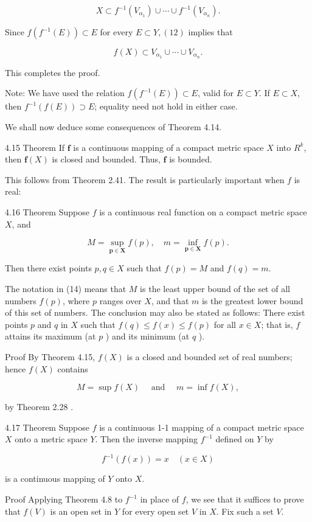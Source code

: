 \documentclass[10pt]{article}
\begin{document}
$$
X \subset f^{-1}\left(V_{\alpha_{1}}\right) \cup \cdots \cup f^{-1}\left(V_{\alpha_{n}}\right) .
$$

Since $f\left(f^{-1}(E)\right) \subset E$ for every $E \subset Y,(12)$ implies that

$$
f(X) \subset V_{\alpha_{1}} \cup \cdots \cup V_{\alpha_{n}} .
$$

This completes the proof.

Note: We have used the relation $f\left(f^{-1}(E)\right) \subset E$, valid for $E \subset Y$. If $E \subset X$, then $f^{-1}(f(E)) \supset E$; equality need not hold in either case.

We shall now deduce some consequences of Theorem 4.14.

4.15 Theorem If $\mathbf{f}$ is a continuous mapping of a compact metric space $X$ into $R^{k}$, then $\mathbf{f}(X)$ is closed and bounded. Thus, $\mathbf{f}$ is bounded.

This follows from Theorem 2.41. The result is particularly important when $f$ is real:

4.16 Theorem Suppose $f$ is a continuous real function on a compact metric space $X$, and

$$
M=\sup _{\boldsymbol{p} \in \boldsymbol{X}} f(p), \quad m=\inf _{\boldsymbol{p} \in \boldsymbol{X}} f(p) .
$$

Then there exist points $p, q \in X$ such that $f(p)=M$ and $f(q)=m$.

The notation in (14) means that $M$ is the least upper bound of the set of all numbers $f(p)$, where $p$ ranges over $X$, and that $m$ is the greatest lower bound of this set of numbers. The conclusion may also be stated as follows: There exist points $p$ and $q$ in $X$ such that $f(q) \leq f(x) \leq f(p)$ for all $x \in X$; that is, $f$ attains its maximum (at $p$ ) and its minimum (at $q$ ).

Proof By Theorem 4.15, $f(X)$ is a closed and bounded set of real numbers; hence $f(X)$ contains

$$
M=\sup f(X) \quad \text { and } \quad m=\inf f(X),
$$

by Theorem 2.28 .

4.17 Theorem Suppose $f$ is a continuous 1-1 mapping of a compact metric space $X$ onto a metric space $Y$. Then the inverse mapping $f^{-1}$ defined on $Y$ by

$$
f^{-1}(f(x))=x \quad(x \in X)
$$

is a continuous mapping of $Y$ onto $X$.

Proof Applying Theorem 4.8 to $f^{-1}$ in place of $f$, we see that it suffices to prove that $f(V)$ is an open set in $Y$ for every open set $V$ in $X$. Fix such a set $V$.
\end{document}
